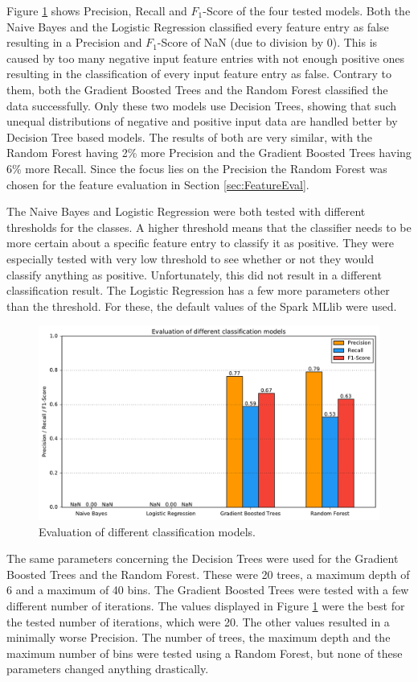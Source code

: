 Figure \ref{classifier_eval} shows Precision, Recall and $F_1$-Score of the four tested models. Both the Naive Bayes and the Logistic Regression classified every feature entry as false resulting in a Precision and $F_1$-Score of NaN (due to division by 0). This is caused by too many negative input feature entries with not enough positive ones resulting in the classification of every input feature entry as false. Contrary to them, both the Gradient Boosted Trees and the Random Forest classified the data successfully. Only these two models use Decision Trees, showing that such unequal distributions of negative and positive input data are handled better by Decision Tree based models. The results of both are very similar, with the Random Forest having 2\% more Precision and the Gradient Boosted Trees having 6\% more Recall. Since the focus lies on the Precision the Random Forest was chosen for the feature evaluation in Section \ref{sec:FeatureEval}.\par
The Naive Bayes and Logistic Regression were both tested with different thresholds for the classes. A higher threshold means that the classifier needs to be more certain about a specific feature entry to classify it as positive. They were especially tested with very low threshold to see whether or not they would classify anything as positive. Unfortunately, this did not result in a different classification result. The Logistic Regression has a few more parameters other than the threshold. For these, the default values of the Spark MLlib were used.\par
\begin{figure}[H]
	\centering
	\includegraphics[width=\textwidth]{img/classifier_eval}
	\caption{Evaluation of different classification models.}
	\label{classifier_eval}
\end{figure}
The same parameters concerning the Decision Trees were used for the Gradient Boosted Trees and the Random Forest. These were 20 trees, a maximum depth of 6 and a maximum of 40 bins. The Gradient Boosted Trees were tested with a few different number of iterations. The values displayed in Figure \ref{classifier_eval} were the best for the tested number of iterations, which were 20. The other values resulted in a minimally worse Precision. The number of trees, the maximum depth and the maximum number of bins were tested using a Random Forest, but none of these parameters changed anything drastically.\par
